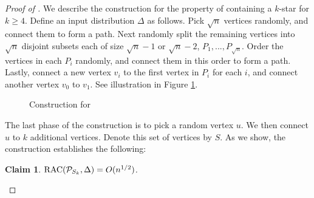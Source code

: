 \documentclass[11pt]{article}
\numberwithin{equation}{section}
\newtheorem{claim}[claim]{Claim}
\renewcommand{\P}{\mathcal{P}}
\newcommand{\kstar}[1]{\ensuremath{#1}-star}
\newcommand{\1}{\mathbf{1}}
\begin{document}
\begin{proof}[Proof of ]
We describe the construction for the property of containing a \kstar{k} for $k \ge 4$. Define an input distribution $\Delta$ as follows. Pick $\sqrt{n}$ vertices randomly, and connect them to form a path. Next randomly split the remaining vertices into $\sqrt{n}$ disjoint subsets each of size $\sqrt{n} - 1$ or $\sqrt{n}-2$, $P_1,...,P_{\sqrt{n}}$. Order the vertices in each $P_i$ randomly, and connect them in this order to form a path. Lastly, connect a new vertex $v_i$ to the first vertex in $P_i$ for each $i$, and connect another vertex $v_0$ to $v_1$. See illustration in Figure \ref{fig:paths11}.

\begin{figure}
\begin{center}
 \caption{Construction for  \label{fig:paths11}}
\end{center}
\end{figure}



The last phase of the construction is to pick a random vertex $u$. We then connect $u$ to $k$ additional vertices. Denote this set of vertices by $S$. As we show, the construction establishes the following:
\begin{claim} \label{claim:path:upperbound}
$\RACC(\P_{S_k}, \Delta) = O(n^{1/2})$.
\end{claim}


\end{proof}
\end{document}
